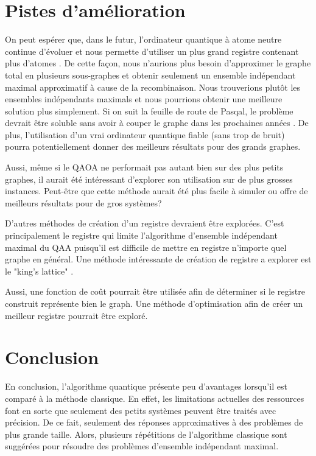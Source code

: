 \documentclass[11pt]{article}
\begin{document}
\section{Pistes d'amélioration}

On peut espérer que, dans le futur, l'ordinateur quantique à atome neutre continue d'évoluer et nous permette d'utiliser un plus grand registre contenant plus d'atomes \cite{noauthor_pasqal_nodate}. De cette façon, nous n'aurions plus besoin d'approximer le graphe total en plusieurs sous-graphes et obtenir seulement un ensemble indépendant maximal approximatif à cause de la recombinaison. Nous trouverions plutôt les ensembles indépendants maximals et nous pourrions obtenir une meilleure solution plus simplement. Si on suit la feuille de route de Pasqal, le problème devrait être soluble sans avoir à couper le graphe dans les prochaines années \cite{noauthor_our_nodate}. De plus, l'utilisation d'un vrai ordinateur quantique fiable (sans trop de bruit) pourra potentiellement donner des meilleurs résultats pour des grands graphes.

Aussi, même si le QAOA ne performait pas autant bien sur des plus petits graphes, il aurait été intéressant d'explorer son utilisation sur de plus grosses instances. Peut-être que cette méthode aurait été plus facile à simuler ou offre de meilleurs résultats pour de gros systèmes?

D'autres méthodes de création d'un registre devraient être explorées. C'est principalement le registre qui limite l'algorithme d'ensemble indépendant maximal du QAA puisqu'il est difficile de mettre en registre n'importe quel graphe en général. Une méthode intéressante de création de registre a explorer est le "king's lattice" \cite{kim_quantum_2023}.

Aussi, une fonction de coût pourrait être utilisée afin de déterminer si le registre construit représente bien le graph. Une méthode d'optimisation afin de créer un meilleur registre pourrait être exploré.


\section{Conclusion}
En conclusion, l'algorithme quantique présente peu d’avantages lorsqu'il est comparé à la méthode classique. En effet, les limitations actuelles des ressources font en sorte que seulement des petits systèmes peuvent être traités avec précision. De ce fait, seulement des réponses approximatives à des problèmes de plus grande taille. Alors, plusieurs répétitions de l'algorithme classique sont suggérées pour résoudre des problèmes d'ensemble indépendant maximal. 
\end{document}
